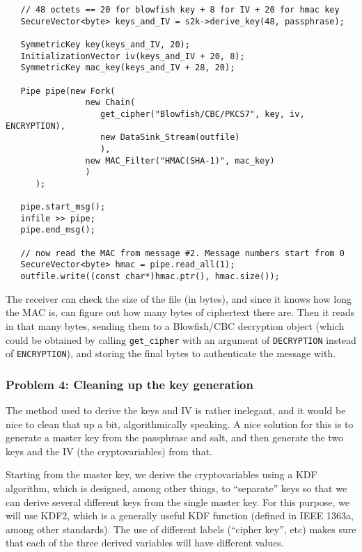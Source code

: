\documentclass{article}
\newcommand{\type}[1]{\texttt{#1}}
\begin{document}
\begin{verbatim}
   // 48 octets == 20 for blowfish key + 8 for IV + 20 for hmac key
   SecureVector<byte> keys_and_IV = s2k->derive_key(48, passphrase);

   SymmetricKey key(keys_and_IV, 20);
   InitializationVector iv(keys_and_IV + 20, 8);
   SymmetricKey mac_key(keys_and_IV + 28, 20);

   Pipe pipe(new Fork(
                new Chain(
                   get_cipher("Blowfish/CBC/PKCS7", key, iv, ENCRYPTION),
                   new DataSink_Stream(outfile)
                   ),
                new MAC_Filter("HMAC(SHA-1)", mac_key)
                )
      );

   pipe.start_msg();
   infile >> pipe;
   pipe.end_msg();

   // now read the MAC from message #2. Message numbers start from 0
   SecureVector<byte> hmac = pipe.read_all(1);
   outfile.write((const char*)hmac.ptr(), hmac.size());
\end{verbatim}

The receiver can check the size of the file (in bytes), and since it knows how
long the MAC is, can figure out how many bytes of ciphertext there are. Then it
reads in that many bytes, sending them to a Blowfish/CBC decryption object
(which could be obtained by calling \verb|get_cipher| with an argument of
\type{DECRYPTION} instead of \type{ENCRYPTION}), and storing the final bytes to
authenticate the message with.

\subsubsection{Problem 4: Cleaning up the key generation}

The method used to derive the keys and IV is rather inelegant, and it would be
nice to clean that up a bit, algorithmically speaking. A nice solution for this
is to generate a master key from the passphrase and salt, and then generate the
two keys and the IV (the cryptovariables) from that.

Starting from the master key, we derive the cryptovariables using a KDF
algorithm, which is designed, among other things, to ``separate'' keys so that
we can derive several different keys from the single master key. For this
purpose, we will use KDF2, which is a generally useful KDF function (defined in
IEEE 1363a, among other standards). The use of different labels (``cipher
key'', etc) makes sure that each of the three derived variables will have
different values.
\end{document}
